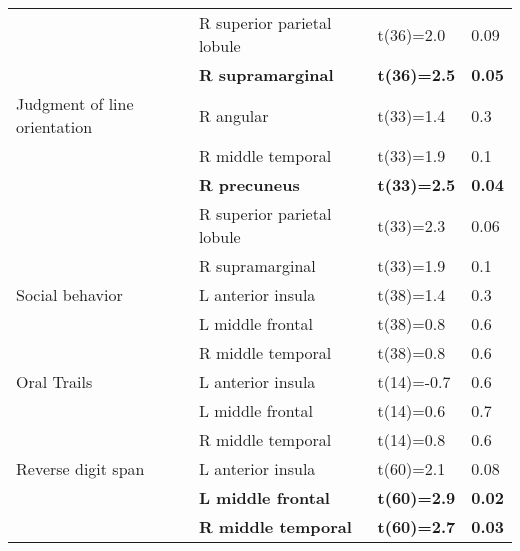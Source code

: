 \documentclass[]{article}
\begin{document}
\begin{table}[ht]
\begin{tabular}{llll}
   & R superior parietal lobule & t(36)=2.0 & 0.09 \\ 
   & \textbf{R supramarginal} & \textbf{t(36)=2.5} & \textbf{0.05} \\ 
  Judgment of line orientation & R angular & t(33)=1.4 & 0.3 \\ 
   & R middle temporal & t(33)=1.9 & 0.1 \\ 
   & \textbf{R precuneus} & \textbf{t(33)=2.5} & \textbf{0.04} \\ 
   & R superior parietal lobule & t(33)=2.3 & 0.06 \\ 
   & R supramarginal & t(33)=1.9 & 0.1 \\ 
  Social behavior & L anterior insula & t(38)=1.4 & 0.3 \\ 
   & L middle frontal & t(38)=0.8 & 0.6 \\ 
   & R middle temporal & t(38)=0.8 & 0.6 \\ 
  Oral Trails & L anterior insula & t(14)=-0.7 & 0.6 \\ 
   & L middle frontal & t(14)=0.6 & 0.7 \\ 
   & R middle temporal & t(14)=0.8 & 0.6 \\ 
  Reverse digit span & L anterior insula & t(60)=2.1 & 0.08 \\ 
   & \textbf{L middle frontal} & \textbf{t(60)=2.9} & \textbf{0.02} \\ 
   & \textbf{R middle temporal} & \textbf{t(60)=2.7} & \textbf{0.03} \\ 
   \hline
\end{tabular}
\end{table}
\end{document}
